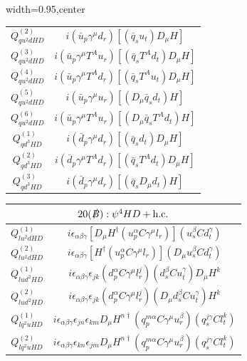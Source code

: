 \begin{table}[H]
\begin{center}
\begin{adjustbox}{width=0.95\textwidth,center}
\begin{minipage}[t]{6.1cm}
\begin{tabular}[t]{c|c}
%
$Q_{qu^2dHD}^{(2)}$  &  $i (\bar u_p \gamma^\mu d_r) [(\bar q_s u_t) D_\mu H]$ \\
%
$Q_{qu^2dHD}^{(3)}$  &  $i (\bar u_p \gamma^\mu T^A u_r) [(\bar q_s T^A d_t) D_\mu H]$ \\
%
$Q_{qu^2dHD}^{(4)}$  &  $i (\bar u_p \gamma^\mu T^A d_r) [(\bar q_s T^A u_t)  D_\mu H]$ \\
%
$Q_{qu^2dHD}^{(5)}$  &  $i (\bar u_p \gamma^\mu u_r) [(D_\mu \bar q_s d_t) H]$ \\
%
$Q_{qu^2dHD}^{(6)}$  &  $i (\bar u_p \gamma^\mu T^A u_r) [(D_\mu \bar q_s T^A d_t) H]$ \\
%
$Q_{qd^3HD}^{(1)}$  &  $i (\bar d_p \gamma^\mu d_r) [(\bar q_s d_t) D_\mu H]$ \\
%
$Q_{qd^3HD}^{(2)}$  &  $i (\bar d_p \gamma^\mu T^A d_r) [(\bar q_s T^A d_t) D_\mu H]$ \\
%
$Q_{qd^3HD}^{(3)}$  &  $i (\bar d_p \gamma^\mu d_r) [(\bar q_s D_\mu d_t) H]$ \\
%
\end{tabular}
\end{minipage}
\hspace{1cm}
\begin{minipage}[t]{7.1cm}
\renewcommand{\arraystretch}{1.5}
\begin{tabular}[t]{c|c}
\multicolumn{2}{c}{\boldmath$20(\slashed B):\psi^4HD + \mathrm{h.c.}$} \\
\hline
$Q_{lu^2dHD}^{(1)}$  &  $i \epsilon_{\alpha\beta\gamma} [D_\mu H^\dag (u_p^\alpha C \gamma^\mu l_r)] (u_s^\beta C d_t^\gamma)$ \\
%
$Q_{lu^2dHD}^{(2)}$  &  $i \epsilon_{\alpha\beta\gamma} [H^\dag (u_p^\alpha C \gamma^\mu l_r)] (D_\mu u_s^\beta C d_t^\gamma)$ \\
%
$Q_{lud^2HD}^{(1)}$  &  $i \epsilon_{\alpha\beta\gamma} \epsilon_{jk} (d_p^\alpha C \gamma^\mu l_r^j) (d_s^\beta C u_t^\gamma) D_\mu H^k$ \\
%
$Q_{lud^2HD}^{(2)}$  &  $i \epsilon_{\alpha\beta\gamma} \epsilon_{jk} (d_p^\alpha C \gamma^\mu l_r^j) (D_\mu d_s^\beta C u_t^\gamma) H^k$ \\
%
$Q_{lq^2uHD}^{(1)}$  &  $i \epsilon_{\alpha\beta\gamma} \epsilon_{jn} \epsilon_{km} D_\mu H^{n\dag} (q_p^{m\alpha} C \gamma^\mu u_r^\beta) (q_s^{j\gamma} C l_t^k)$ \\
%
$Q_{lq^2uHD}^{(2)}$  &  $i \epsilon_{\alpha\beta\gamma} \epsilon_{kn} \epsilon_{jm} D_\mu H^{n\dag} (q_p^{m\alpha} C \gamma^\mu u_r^\beta) (q_s^{j\gamma} C l_t^k)$ \\

\end{tabular}
\end{minipage}
\end{adjustbox}
\end{center}
\end{table}
